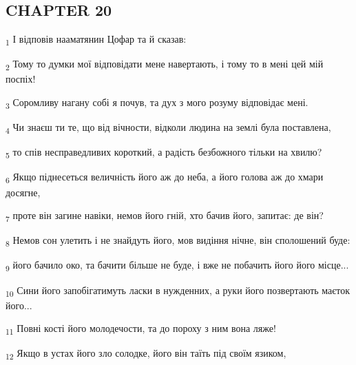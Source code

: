 \subsection{CHAPTER 20}
\begin{tcolorbox}
\textsubscript{1} І відповів нааматянин Цофар та й сказав:
\end{tcolorbox}
\begin{tcolorbox}
\textsubscript{2} Тому то думки мої відповідати мене навертають, і тому то в мені цей мій поспіх!
\end{tcolorbox}
\begin{tcolorbox}
\textsubscript{3} Соромливу нагану собі я почув, та дух з мого розуму відповідає мені.
\end{tcolorbox}
\begin{tcolorbox}
\textsubscript{4} Чи знаєш ти те, що від вічности, відколи людина на землі була поставлена,
\end{tcolorbox}
\begin{tcolorbox}
\textsubscript{5} то спів несправедливих короткий, а радість безбожного тільки на хвилю?
\end{tcolorbox}
\begin{tcolorbox}
\textsubscript{6} Якщо піднесеться величність його аж до неба, а його голова аж до хмари досягне,
\end{tcolorbox}
\begin{tcolorbox}
\textsubscript{7} проте він загине навіки, немов його гній, хто бачив його, запитає: де він?
\end{tcolorbox}
\begin{tcolorbox}
\textsubscript{8} Немов сон улетить і не знайдуть його, мов видіння нічне, він сполошений буде:
\end{tcolorbox}
\begin{tcolorbox}
\textsubscript{9} його бачило око, та бачити більше не буде, і вже не побачить його його місце...
\end{tcolorbox}
\begin{tcolorbox}
\textsubscript{10} Сини його запобігатимуть ласки в нужденних, а руки його позвертають маєток його...
\end{tcolorbox}
\begin{tcolorbox}
\textsubscript{11} Повні кості його молодечости, та до пороху з ним вона ляже!
\end{tcolorbox}
\begin{tcolorbox}
\textsubscript{12} Якщо в устах його зло солодке, його він таїть під своїм язиком,
\end{tcolorbox}
